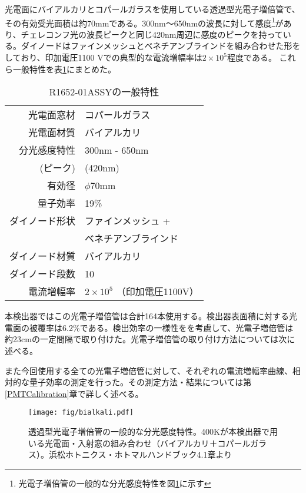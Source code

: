\documentclass[11pt]{ltjsreport}
\newcommand{\figref}[1]{図\ref{#1}}
\newcommand{\tabref}[1]{表\ref{#1}}
\newcommand{\secref}[1]{第\ref{#1}章}
\begin{document}
光電面にバイアルカリとコパールガラスを使用している透過型光電子増倍管で、その有効受光面積は約70mmである。300nm〜650nmの波長に対して感度\footnote{光電子増倍管の一般的な分光感度特性を\figref{Bialkali}に示す}があり、チェレコンフ光の波長ピークと同じ420nm周辺に感度のピークを持っている。ダイノードはファインメッシュとベネチアンブラインドを組み合わせた形をしており、印加電圧1100 Vでの典型的な電流増幅率は$2 \times 10^{5}$程度である。
これら一般特性を\tabref{R1652-spec}にまとめた。

\begin{table}[htbp]
\caption[R1652-01ASSYの一般特性]{R1652-01ASSYの一般特性}
\begin{center}
\begin{tabular}{rl}
\hline \hline
光電面窓材 & コパールガラス \\
光電面材質 & バイアルカリ \\
分光感度特性 & 300nm - 650nm \\
(ピーク) & (420nm) \\
有効径 & $\phi$70mm \\
量子効率 & 19\% \\
ダイノード形状 & ファインメッシュ +\\
 & ベネチアンブラインド \\
ダイノード材質 & バイアルカリ \\
ダイノード段数 & 10 \\
電流増幅率 & $ 2 \times 10^{5}$ （印加電圧1100V）\\
\hline \hline
\end{tabular}
\end{center}
\label{R1652-spec}
\end{table}%

本検出器ではこの光電子増倍管は合計164本使用する。検出器表面積に対する光電面の被覆率は6.2\%である。検出効率の一様性をを考慮して、光電子増倍管は約23cmの一定間隔で取り付けた。光電子増倍管の取り付け方法については次に述べる。

また今回使用する全ての光電子増倍管に対して、それぞれの電流増幅率曲線、相対的な量子効率の測定を行った。その測定方法・結果については\secref{PMTCalibration}で詳しく述べる。

\begin{figure}[!h]
\centering
\texttt{[image: fig/bialkali.pdf]}
\caption[光電子増倍管の一般的な分光感度特性]{透過型光電子増倍管の一般的な分光感度特性。400Kが本検出器で用いる光電面・入射窓の組み合わせ（バイアルカリ＋コパールガラス）。浜松ホトニクス・ホトマルハンドブック4.1章より}
\label{Bialkali}
\end{figure}
\end{document}
